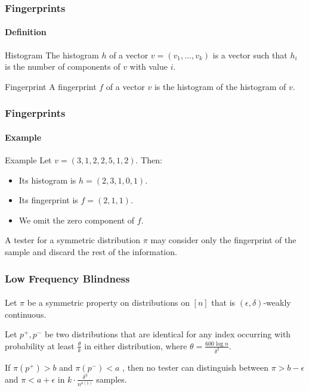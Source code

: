 \documentclass{beamer}
\begin{document}
\begin{frame}
  \frametitle{Fingerprints} \framesubtitle{Definition}

  \begin{block}{Histogram}
    The histogram $h$ of a vector $v=(v_1,\ldots,v_k)$ is a vector such
    that $h_i$ is the number of components of $v$ with value $i$.
  \end{block}
  \begin{block}{Fingerprint}
    A fingerprint $f$ of a vector $v$ is the histogram of the
    histogram of $v$.
  \end{block}
\end{frame}

\begin{frame}
  \frametitle{Fingerprints} \framesubtitle{Example}

  \begin{block}{Example}
    Let $v=(3,1,2,2,5,1,2)$. Then:
    \begin{itemize}
    \item Its histogram is $h=(2,3,1,0,1)$.
    \item Its fingerprint is $f=(2,1,1)$.
    \item We omit the zero component of $f$.
    \end{itemize}
  \end{block}
  \begin{block}{}
    A tester for a symmetric distribution $\pi$ may consider only the
    fingerprint of the sample and discard the rest of the information.
  \end{block}
\end{frame}


\begin{frame}
  \frametitle{Low Frequency Blindness} \framesubtitle{}
  \begin{theorem}
    Let $\pi$ be a symmetric property on distributions on $[n]$ that
    is $(\epsilon,\delta)$-weakly continuous.

    Let $p^+,p^-$ be two distributions that are identical for any
    index occurring with probability at least $\frac{\theta}{k}$ in
    either distribution, where $\theta=\frac{600\log n}{\delta^2}$.

    If $\pi(p^+)>b$ and $\pi(p^-)<a$ , then no tester can distinguish
    between $\pi>b-\epsilon$ and $\pi<a+\epsilon$ in $k\cdot
    \frac{\delta^3}{n^{o(1)}}$ samples.
  \end{theorem}
\end{frame}
\end{document}
